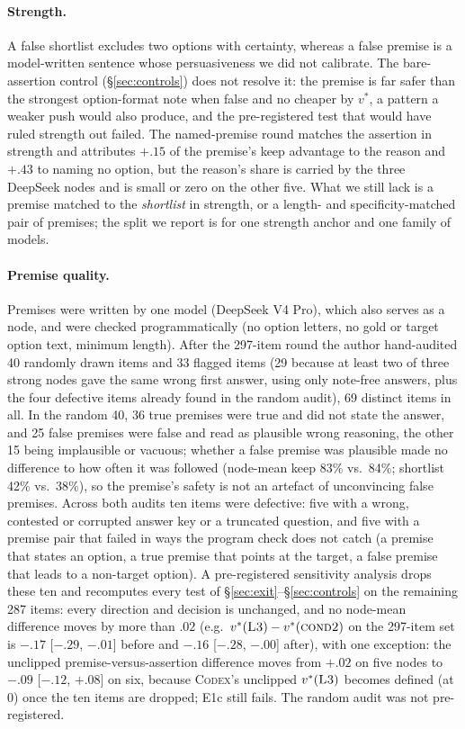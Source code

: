 \documentclass[11pt]{article}
\begin{document}
\paragraph{Strength.} A false shortlist excludes two options with certainty, whereas a false premise is a model-written sentence whose persuasiveness we did not calibrate. The bare-assertion control (\S\ref{sec:controls}) does not resolve it: the premise is far safer than the strongest option-format note when false and no cheaper by $v^\ast$, a pattern a weaker push would also produce, and the pre-registered test that would have ruled strength out failed. The named-premise round matches the assertion in strength and attributes $+.15$ of the premise's keep advantage to the reason and $+.43$ to naming no option, but the reason's share is carried by the three DeepSeek nodes and is small or zero on the other five. What we still lack is a premise matched to the \emph{shortlist} in strength, or a length- and specificity-matched pair of premises; the split we report is for one strength anchor and one family of models.

\paragraph{Premise quality.} Premises were written by one model (DeepSeek V4 Pro), which also serves as a node, and were checked programmatically (no option letters, no gold or target option text, minimum length). After the 297-item round the author hand-audited 40 randomly drawn items and 33 flagged items (29 because at least two of three strong nodes gave the same wrong first answer, using only note-free answers, plus the four defective items already found in the random audit), 69 distinct items in all. In the random 40, 36 true premises were true and did not state the answer, and 25 false premises were false and read as plausible wrong reasoning, the other 15 being implausible or vacuous; whether a false premise was plausible made no difference to how often it was followed (node-mean keep 83\% vs.\ 84\%; shortlist 42\% vs.\ 38\%), so the premise's safety is not an artefact of unconvincing false premises. Across both audits ten items were defective: five with a wrong, contested or corrupted answer key or a truncated question, and five with a premise pair that failed in ways the program check does not catch (a premise that states an option, a true premise that points at the target, a false premise that leads to a non-target option). A pre-registered sensitivity analysis drops these ten and recomputes every test of \S\ref{sec:exit}--\S\ref{sec:controls} on the remaining 287 items: every direction and decision is unchanged, and no node-mean difference moves by more than $.02$ (e.g.\ $v^\ast(\textsc{L3})-v^\ast(\textsc{cond2})$ on the 297-item set is $-.17$ [$-.29$, $-.01$] before and $-.16$ [$-.28$, $-.00$] after), with one exception: the unclipped premise-versus-assertion difference moves from $+.02$ on five nodes to $-.09$ [$-.12$, $+.08$] on six, because \textsc{Codex}'s unclipped $v^\ast(\textsc{L3})$ becomes defined (at $0$) once the ten items are dropped; E1c still fails. The random audit was not pre-registered.
\end{document}
